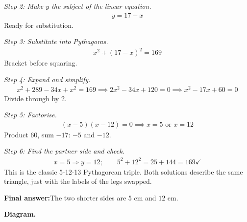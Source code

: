\documentclass[11pt]{article}
\begin{document}
\textit{Step 2: Make \( y \) the subject of the linear equation.}
\[\begin{gathered}
y = 17 - x
\end{gathered}\]
Ready for substitution.

\textit{Step 3: Substitute into Pythagoras.}
\[\begin{gathered}
x^2 + (17 - x)^2 = 169
\end{gathered}\]
Bracket before squaring.

\textit{Step 4: Expand and simplify.}
\[\begin{gathered}
x^2 + 289 - 34x + x^2 = 169 \implies 2x^2 - 34x + 120 = 0 \implies x^2 - 17x + 60 = 0
\end{gathered}\]
Divide through by 2.

\textit{Step 5: Factorise.}
\[\begin{gathered}
(x - 5)(x - 12) = 0 \implies x = 5 \text{ or } x = 12
\end{gathered}\]
Product 60, sum \( -17 \): \( -5 \) and \( -12 \).

\textit{Step 6: Find the partner side and check.}
\[\begin{gathered}
x = 5 \Rightarrow y = 12; \qquad 5^2 + 12^2 = 25 + 144 = 169 \checkmark
\end{gathered}\]
This is the classic 5-12-13 Pythagorean triple. Both solutions describe the same triangle, just with the labels of the legs swapped.

\begin{answerbox}
\textbf{Final answer:}\quad The two shorter sides are \(\displaystyle 5\) cm and \(\displaystyle 12\) cm.
\end{answerbox}
\textbf{Diagram.}
\end{document}

